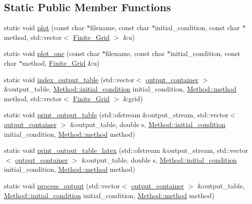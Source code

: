 \subsection*{Static Public Member Functions}
\begin{DoxyCompactItemize}
\item 
static void \hyperlink{classOutput_a4b0d65315774867eb1c61a83c5023e7a}{plot} (const char $\ast$filename, const char $\ast$initial\-\_\-condition, const char $\ast$method, std\-::vector$<$ \hyperlink{classFinite__Grid}{Finite\-\_\-\-Grid} $>$ \&u)
\item 
static void \hyperlink{classOutput_a714ad104a1c57eaf3c7727bd8df70529}{plot\-\_\-one} (const char $\ast$filename, const char $\ast$initial\-\_\-condition, const char $\ast$method, \hyperlink{classFinite__Grid}{Finite\-\_\-\-Grid} \&u)
\item 
static void \hyperlink{classOutput_acfc895b899cb396ad02f5d246c28b676}{index\-\_\-output\-\_\-table} (std\-::vector$<$ \hyperlink{classOutput_a579e71138176ba949f09d507e791ac68}{output\-\_\-container} $>$ \&output\-\_\-table, \hyperlink{structMethod_1_1initial__condition}{Method\-::initial\-\_\-condition} initial\-\_\-condition, \hyperlink{structMethod_1_1method}{Method\-::method} method, std\-::vector$<$ \hyperlink{classFinite__Grid}{Finite\-\_\-\-Grid} $>$ \&grid)
\item 
static void \hyperlink{classOutput_a4b5783fc07e407c9558327580e46ffbb}{print\-\_\-output\-\_\-table} (std\-::ofstream \&output\-\_\-stream, std\-::vector$<$ \hyperlink{classOutput_a579e71138176ba949f09d507e791ac68}{output\-\_\-container} $>$ \&output\-\_\-table, double s, \hyperlink{structMethod_1_1initial__condition}{Method\-::initial\-\_\-condition} initial\-\_\-condition, \hyperlink{structMethod_1_1method}{Method\-::method} method)
\item 
static void \hyperlink{classOutput_a2d38165ba7c9edd016fbf18d9424e740}{print\-\_\-output\-\_\-table\-\_\-latex} (std\-::ofstream \&output\-\_\-stream, std\-::vector$<$ \hyperlink{classOutput_a579e71138176ba949f09d507e791ac68}{output\-\_\-container} $>$ \&output\-\_\-table, double s, \hyperlink{structMethod_1_1initial__condition}{Method\-::initial\-\_\-condition} initial\-\_\-condition, \hyperlink{structMethod_1_1method}{Method\-::method} method)
\item 
static void \hyperlink{classOutput_ac0d50ea148b8d858da46fea07b92617b}{process\-\_\-output} (std\-::vector$<$ \hyperlink{classOutput_a579e71138176ba949f09d507e791ac68}{output\-\_\-container} $>$ \&output\-\_\-table, \hyperlink{structMethod_1_1initial__condition}{Method\-::initial\-\_\-condition} initial\-\_\-condition, \hyperlink{structMethod_1_1method}{Method\-::method} method)
\end{DoxyCompactItemize}


